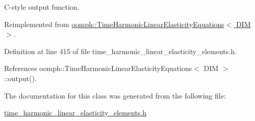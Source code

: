 C-\/style output function. 



Reimplemented from \hyperlink{classoomph_1_1TimeHarmonicLinearElasticityEquations_a1913ef957b846a4bf04991718b83f9b5}{oomph\+::\+Time\+Harmonic\+Linear\+Elasticity\+Equations$<$ D\+I\+M $>$}.



Definition at line 415 of file time\+\_\+harmonic\+\_\+linear\+\_\+elasticity\+\_\+elements.\+h.



References oomph\+::\+Time\+Harmonic\+Linear\+Elasticity\+Equations$<$ D\+I\+M $>$\+::output().



The documentation for this class was generated from the following file\+:\begin{DoxyCompactItemize}
\item 
\hyperlink{time__harmonic__linear__elasticity__elements_8h}{time\+\_\+harmonic\+\_\+linear\+\_\+elasticity\+\_\+elements.\+h}\end{DoxyCompactItemize}
